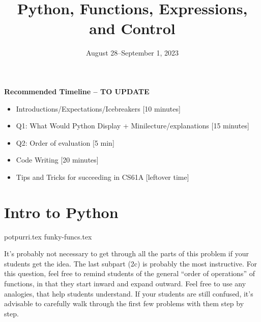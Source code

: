 \documentclass{exam}
\title{Python, Functions, Expressions, and Control}
\date{August 28--September 1, 2023}
\begin{document}
\maketitle
\begin{meta}
\textbf{Recommended Timeline -- TO UPDATE}
\begin{itemize}
  \item Introductions/Expectations/Icebreakers [10 minutes]
  \item Q1: What Would Python Display + Minilecture/explanations [15 minutes]
  \item Q2: Order of evaluation [5 min]
  \item Code Writing [20 minutes]
  \item Tips and Tricks for succeeding in CS61A [leftover time]
\end{itemize}
\end{meta}


\section{Intro to Python}
\begin{questions}
{potpurri.tex}
{funky-funcs.tex}
\begin{questionmeta}
  It's probably not necessary to get through all the parts of this problem if your students get the idea. The last subpart (2c) is probably the most instructive. 
  For this question, feel free to remind students of the general ``order of operations'' of functions, in that they start inward and expand outward. Feel free to use any analogies, that help students understand.
  If your students are still confused, it's advisable to carefully walk through the first few problems with them step by step.
\end{questionmeta}
\end{questions}
\end{document}
